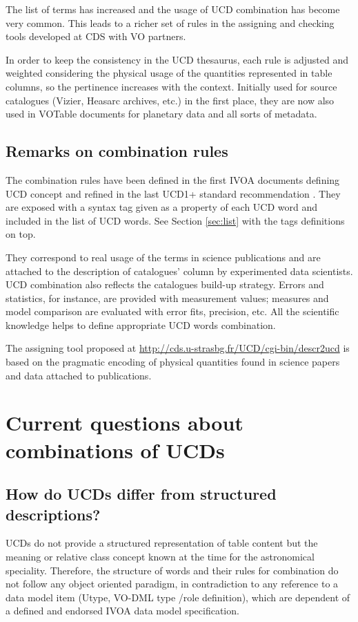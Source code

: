 \documentclass[11pt,a4paper]{ivoa}
\begin{document}
The list of terms has increased and the usage of UCD combination has become very common. This leads
to a richer set of rules in the assigning and checking tools developed at CDS with VO partners.

In order to keep the consistency in the UCD thesaurus, each rule is adjusted and weighted considering 
the physical usage of the quantities represented in table columns, so the pertinence increases with 
the context. Initially used for source catalogues (Vizier, Heasarc archives, etc.) in the first place, 
they are now also used in VOTable documents for planetary data \citep{wd:epntap,erard-vespa} and all sorts of metadata.

\subsection{Remarks on combination rules}
The combination rules have been defined in the first IVOA documents defining UCD concept
\citep{2005ivoa.spec.0819D} and refined in the last UCD1+ standard recommendation \citep{2018ivoa.spec.0527PM}. 
They are exposed with a syntax tag given as a property of each UCD word 
and included in the list of UCD words. See Section \ref{sec:list} with the tags definitions on top.

They correspond to real usage of the terms in science publications and are attached to the description 
of catalogues' column by experimented data scientists. UCD combination also reflects the catalogues 
build-up strategy. Errors and statistics, for instance, are provided with measurement values; measures 
and model comparison are evaluated with error fits, precision, etc. All the scientific knowledge helps 
to define appropriate UCD words combination.

The assigning tool proposed at \url{http://cds.u-strasbg.fr/UCD/cgi-bin/descr2ucd} is based on the
pragmatic encoding of physical quantities found in science papers and data attached to publications.

\section{Current questions about combinations of UCDs}
\subsection{How do UCDs differ from structured descriptions?}

UCDs do not provide a structured representation of table content but the meaning or relative class 
concept known at the time for the astronomical speciality. Therefore, the structure of words and 
their rules for combination do not follow any object oriented paradigm, in contradiction to any 
reference to a data model item (Utype, VO-DML type /role definition), which are dependent of a 
defined and endorsed IVOA data model specification.
\end{document}
